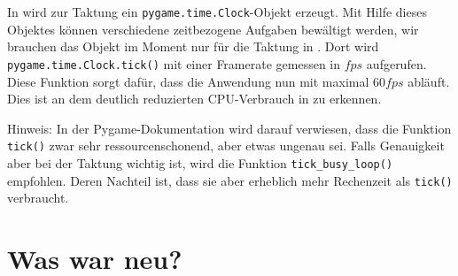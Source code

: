 In  wird zur Taktung ein \texttt{pygame.time.Clock}-Objekt erzeugt. Mit Hilfe dieses Objektes können verschiedene zeitbezogene Aufgaben bewältigt werden, wir brauchen das Objekt im Moment nur für die Taktung in . Dort wird \texttt{pygame.time.Clock.\-tick()} mit einer Framerate gemessen in $fps$ aufgerufen. Diese Funktion sorgt dafür, dass die Anwendung nun mit maximal $60fps$ abläuft. Dies ist an dem deutlich reduzierten CPU-Verbrauch in  zu erkennen.


Hinweis: In der Pygame-Dokumentation wird darauf verwiesen, dass die Funktion \texttt{tick()} zwar sehr ressourcenschonend, aber etwas ungenau sei. Falls Genauigkeit aber bei der Taktung wichtig ist, wird die Funktion \texttt{tick\_busy\_loop()} empfohlen. Deren Nachteil ist, dass sie aber erheblich mehr Rechenzeit als \texttt{tick()} verbraucht.


\section{Was war neu?}

